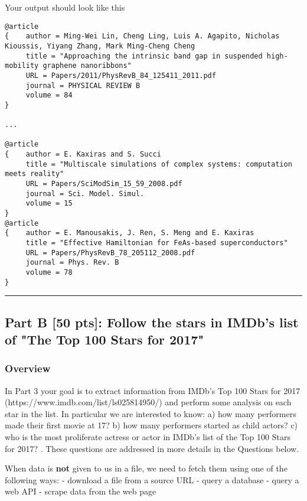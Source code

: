 \documentclass[11pt]{article}
\begin{document}
    Your output should look like this

\begin{verbatim}
@article
{    author = Ming-Wei Lin, Cheng Ling, Luis A. Agapito, Nicholas Kioussis, Yiyang Zhang, Mark Ming-Cheng Cheng
     title = "Approaching the intrinsic band gap in suspended high-mobility graphene nanoribbons"
     URL = Papers/2011/PhysRevB_84_125411_2011.pdf
     journal = PHYSICAL REVIEW B
     volume = 84
}

...

@article
{    author = E. Kaxiras and S. Succi
     title = "Multiscale simulations of complex systems: computation meets reality"
     URL = Papers/SciModSim_15_59_2008.pdf
     journal = Sci. Model. Simul.
     volume = 15
}
@article
{    author = E. Manousakis, J. Ren, S. Meng and E. Kaxiras
     title = "Effective Hamiltonian for FeAs-based superconductors"
     URL = Papers/PhysRevB_78_205112_2008.pdf
     journal = Phys. Rev. B
     volume = 78
}
\end{verbatim}

    \begin{center}\rule{0.5\linewidth}{\linethickness}\end{center}

    \subsection{Part B {[}50 pts{]}: Follow the stars in IMDb's list of "The
Top 100 Stars for
2017"}\label{part-b-50-pts-follow-the-stars-in-imdbs-list-of-the-top-100-stars-for-2017}

\subsubsection{Overview}\label{overview}

In Part 3 your goal is to extract information from IMDb's Top 100 Stars
for 2017 (https://www.imdb.com/list/ls025814950/) and perform some
analysis on each star in the list. In particular we are interested to
know: a) how many performers made their first movie at 17? b) how many
performers started as child actors? c) who is the most proliferate
actress or actor in IMDb's list of the Top 100 Stars for 2017? . These
questions are addressed in more details in the Questions below.

When data is \textbf{not} given to us in a file, we need to fetch them
using one of the following ways: - download a file from a source URL -
query a database - query a web API - scrape data from the web page
\end{document}
